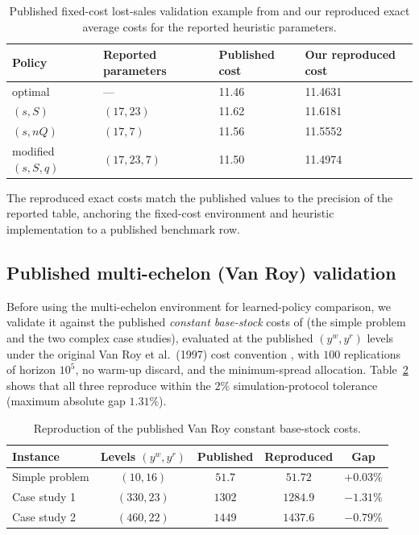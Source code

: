 \documentclass[11pt]{article}
\begin{document}
\begin{table}[!htbp]
\centering
\caption{Published fixed-cost lost-sales validation example from
\citet{Bijvank2015ParametricPolicies} and our reproduced exact average costs for the reported
heuristic parameters.}
\label{tab:fixed-cost-validation}
\begin{tabular}{llll}
\toprule
Policy & Reported parameters & Published cost & Our reproduced cost \\
\midrule
optimal & --- & 11.46 & 11.4631 \\
$(s,S)$ & $(17,23)$ & 11.62 & 11.6181 \\
$(s,nQ)$ & $(17,7)$ & 11.56 & 11.5552 \\
modified $(s,S,q)$ & $(17,23,7)$ & 11.50 & 11.4974 \\
\bottomrule
\end{tabular}
\end{table}
\FloatBarrier

The reproduced exact costs match the published values to the precision of the reported table,
anchoring the fixed-cost environment and heuristic implementation to a published benchmark row.

\subsection{Published multi-echelon (Van Roy) validation}

Before using the multi-echelon environment for learned-policy comparison, we validate it against
the published \emph{constant base-stock} costs of \citet{vanroy1997ndp} (the simple problem and the
two complex case studies), evaluated at the published $(y^w,y^r)$ levels under the original
Van Roy et al.\ (1997) cost convention \citep{vanroy1997ndp}, with $100$ replications of horizon
$10^5$, no warm-up discard, and the minimum-spread allocation. Table~\ref{tab:me-validation} shows
that all three reproduce within the $2\%$ simulation-protocol tolerance (maximum absolute gap
$1.31\%$).

\begin{table}[!htbp]
\centering
\caption{Reproduction of the published Van Roy constant base-stock costs.}
\label{tab:me-validation}
\begin{tabular}{lcccc}
\toprule
Instance & Levels $(y^w,y^r)$ & Published & Reproduced & Gap \\
\midrule
Simple problem & $(10,16)$ & $51.7$ & $51.72$ & $+0.03\%$ \\
Case study 1 & $(330,23)$ & $1302$ & $1284.9$ & $-1.31\%$ \\
Case study 2 & $(460,22)$ & $1449$ & $1437.6$ & $-0.79\%$ \\
\bottomrule
\end{tabular}
\end{table}
\FloatBarrier
\end{document}
